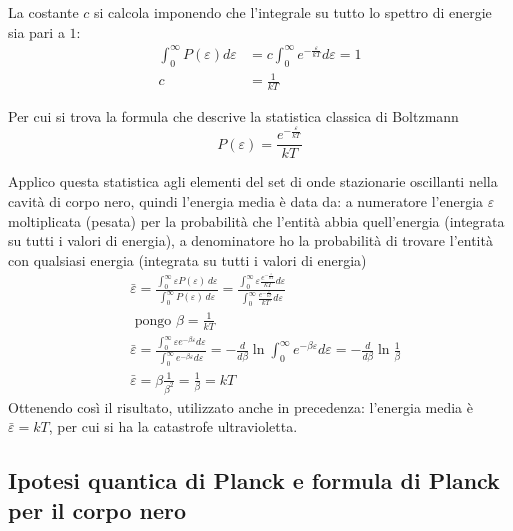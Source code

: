 La costante $c$ si calcola imponendo che l'integrale su tutto lo spettro di energie sia pari a $1$:
\begin{equation}
\begin{split}
\int_{0}^{\infty} P(\varepsilon) d\varepsilon & = c \int_{0}^{\infty} e^{ -\frac{\varepsilon}{kT } } d\varepsilon = 1 \\
c & = \frac{ 1}{kT }
\end{split}
\end{equation}

Per cui si trova la formula che descrive la statistica classica di Boltzmann 
\begin{equation}
P(\varepsilon) = \frac{ e^{ - \frac{\varepsilon}{kT } } }{kT }
\end{equation}

Applico questa statistica agli elementi del set di onde stazionarie oscillanti nella cavità di corpo nero, quindi l'energia media è data da: 
a numeratore l'energia $\varepsilon$ moltiplicata (pesata) per la probabilità che l'entità abbia quell'energia (integrata su tutti i valori di energia), 
a denominatore ho la probabilità di trovare l'entità con qualsiasi energia (integrata su tutti i valori di energia)
\begin{equation}
\begin{split}
& \bar\varepsilon=\frac{\int_{0}^{\infty} \varepsilon P(\varepsilon)\,d\varepsilon}{\int_{0}^{\infty} P(\varepsilon)\,d\varepsilon} = \frac{\int_{0}^{\infty} \varepsilon \frac{ e^{ - \frac{\varepsilon}{kT } } }{kT } d\varepsilon}{\int_{0}^{\infty} \frac{ e^{ - \frac{\varepsilon}{kT } } }{kT }d\varepsilon} \\
& \mbox{ pongo } \beta=\frac{1}{kT} \\
& \bar\varepsilon= \frac{\int_{0}^{\infty} \varepsilon e^{ - \beta \varepsilon } d\varepsilon}{\int_{0}^{\infty} e^{ - \beta \varepsilon } d\varepsilon} = - \frac{ d}{d\beta } \ln \int_0^{\infty} e^{ -\beta \varepsilon } d\varepsilon = - \frac{ d}{d\beta } \ln \frac{ 1}{\beta } \\
& \bar\varepsilon= \beta \frac{ 1}{\beta^2 } = \frac{ 1}{\beta } = kT
\end{split} 
\end{equation}
Ottenendo così il risultato, utilizzato anche in precedenza: l'energia media è $\bar \varepsilon = kT$, per cui si ha la catastrofe ultravioletta.

\subsection{Ipotesi quantica di Planck e formula di Planck per il corpo nero}

